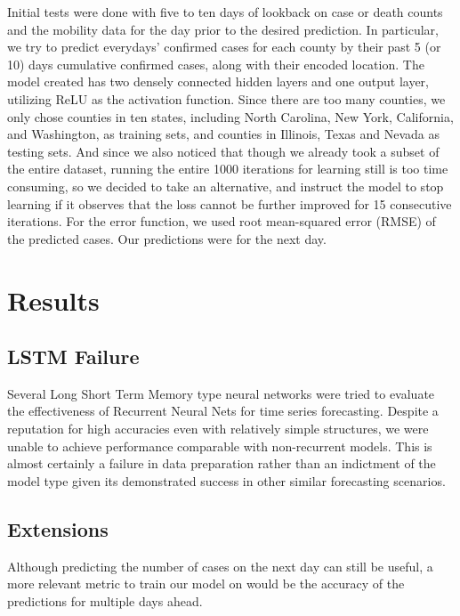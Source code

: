 ﻿\documentclass{article}
\begin{document}
Initial tests were done with five to ten days of lookback on case or death
counts and the mobility data for the day prior to the desired prediction. In
particular, we try to predict everydays’ confirmed cases for each county by
their past 5 (or 10) days cumulative confirmed cases, along with their encoded
location. The model created has two densely connected hidden layers and one
output layer, utilizing ReLU as the activation function. Since there are too
many counties, we only chose counties in ten states, including North Carolina,
New York, California, and Washington, as training sets, and counties in
Illinois, Texas and Nevada as testing sets. And since we also noticed that
though we already took a subset of the entire dataset, running the entire 1000
iterations for learning still is too time consuming, so we decided to take an
alternative, and instruct the model to stop learning if it observes that the
loss cannot be further improved for 15 consecutive iterations. For the error
function, we used root mean-squared error (RMSE) of the predicted cases. Our
predictions were for the next day.


\section*{Results}

\subsection*{LSTM Failure}

Several Long Short Term Memory type neural networks were tried to evaluate the
effectiveness of Recurrent Neural Nets for time series forecasting. Despite a
reputation for high accuracies even with relatively simple structures, we were
unable to achieve performance comparable with non-recurrent models. This is
almost certainly a failure in data preparation rather than an indictment of the
model type given its demonstrated success in other similar forecasting
scenarios. 

\subsection*{Extensions}

Although predicting the number of cases on the next day can still be useful, a
more relevant metric to train our model on would be the accuracy of the
predictions for multiple days ahead.
\end{document}
